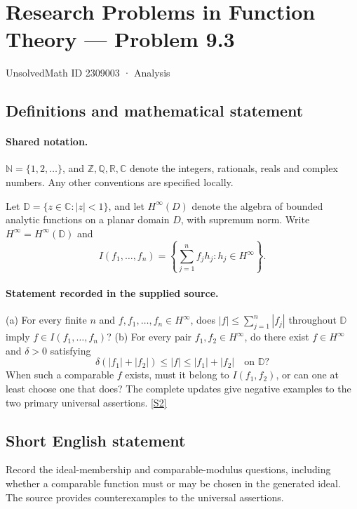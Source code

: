 \documentclass[11pt]{book}
\newcommand{\sref}[2]{\hyperlink{source:#1:#2}{[S#2]}}
\begin{document}
\setcounter{section}{2309002}
\section{Research Problems in Function Theory — Problem 9.3}\label{2309003}
{\small\sffamily UnsolvedMath ID 2309003 · Analysis}
\subsection{Definitions and mathematical statement}

\paragraph{Shared notation.}$\mathbb N=\{1,2,\ldots\}$, and $\mathbb Z,\mathbb Q,\mathbb R,\mathbb C$ denote the integers, rationals, reals and complex numbers. Any other conventions are specified locally.


Let $\mathbb D=\{z\in\mathbb C:|z|<1\}$, and let $H^{\infty}(D)$ denote the algebra of bounded analytic functions on a planar domain $D$, with supremum norm. Write $H^{\infty}=H^{\infty}(\mathbb D)$ and \[I(f_1,\ldots,f_n)=\left\{\sum_{j=1}^nf_jh_j:h_j\in H^{\infty}\right\}.\]
\paragraph{Statement recorded in the supplied source.}
(a) For every finite $n$ and $f,f_1,\ldots,f_n\in H^{\infty}$, does $|f|\le\sum_{j=1}^n|f_j|$ throughout $\mathbb D$ imply $f\in I(f_1,\ldots,f_n)$? (b) For every pair $f_1,f_2\in H^{\infty}$, do there exist $f\in H^{\infty}$ and $\delta>0$ satisfying \[\delta(|f_1|+|f_2|)\le|f|\le|f_1|+|f_2|\quad\text{on }\mathbb D?\] When such a comparable $f$ exists, must it belong to $I(f_1,f_2)$, or can one at least choose one that does? The complete updates give negative examples to the two primary universal assertions. \sref{2309003}{2}
\subsection{Short English statement}
Record the ideal-membership and comparable-modulus questions, including whether a comparable function must or may be chosen in the generated ideal. The source provides counterexamples to the universal assertions.
\end{document}

